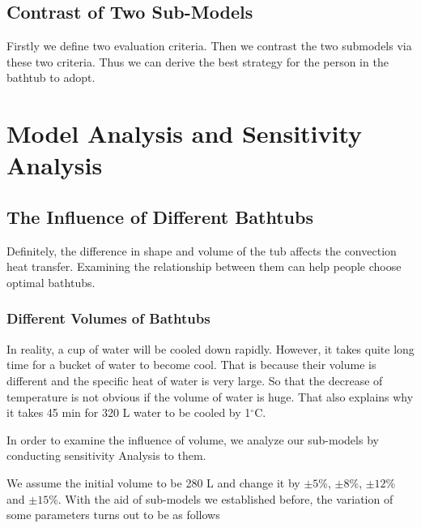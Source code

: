 \documentclass{mcmthesis}
\begin{document}
\subsection{Contrast of Two Sub-Models}

Firstly we define two evaluation criteria. Then we contrast the two submodels via these two criteria. Thus we can derive the best strategy for the person in the bathtub to adopt.

\section{Model Analysis and Sensitivity Analysis}

\subsection{The Influence of Different Bathtubs}

Definitely, the difference in shape and volume of the tub affects the
convection heat transfer. Examining the relationship between them can help
people choose optimal bathtubs.

\subsubsection{Different Volumes of Bathtubs}

In reality, a cup of water will be cooled down rapidly. However, it takes quite long time for a bucket of water to become cool. That is because their volume is different and the specific heat of water is very large. So that the decrease of temperature is not obvious if the volume of water is huge. That also explains why it takes 45 min for 320 L water to be cooled by 1$^\circ$C.

In order to examine the influence of volume, we analyze our sub-models
by conducting sensitivity Analysis to them.

We assume the initial volume to be 280 L and change it by $\pm 5$\%, $\pm 8$\%, $\pm 12$\% and $\pm 15$\%. With the aid of sub-models we established before, the variation of some parameters turns out to be as follows
\end{document}
